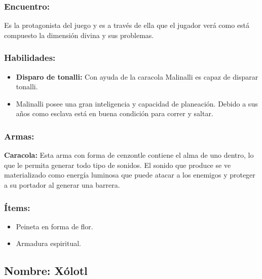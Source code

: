 \documentclass[11pt,letterpaper]{article}
\begin{document}
\subsubsection{Encuentro:}
Es la protagonista del juego y es a través de ella que el jugador verá como está compuesto la dimensión divina y sus problemas. 

\subsubsection{Habilidades:}
\begin{itemize}
	\item \textbf{Disparo de tonalli:} Con ayuda de la caracola Malinalli es capaz de disparar tonalli.
	\item Malinalli posee una gran inteligencia y capacidad de planeación. Debido a sus años como esclava está en buena condición para correr y saltar.
\end{itemize} 
\subsubsection{Armas:}
\textbf{Caracola:} Esta arma con forma de cenzontle contiene el alma de uno dentro, lo que le permita generar todo tipo de sonidos. El sonido que produce se ve materializado como energía luminosa que puede atacar a los enemigos y proteger a su portador al generar una barrera. 
\subsubsection{Ítems:}
\begin{itemize}
	\item Peineta en forma de flor.
	\item Armadura espiritual.
\end{itemize}

\subsection{Nombre: Xólotl}  
\end{document}

